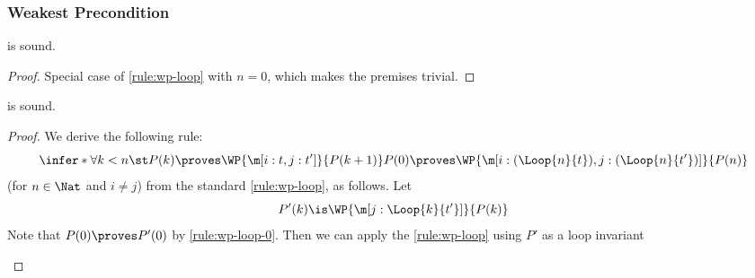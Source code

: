 \documentclass[acmsmall,nonacm,screen,appendix]{acmart}
\begin{document}
\subsubsection{Weakest Precondition}
\begin{lemma}
\label{proof:wp-loop-0}
   is sound.
\end{lemma}

\begin{proof}
  Special case of \ref{rule:wp-loop} with $n=0$,
  which makes the premises trivial.
\end{proof} \begin{lemma}
\label{proof:wp-loop-lockstep}
   is sound.
\end{lemma}

\begin{proof}
  We derive the following rule:
  \[
  \infer*{
    \forall k < n\st
      P(k) \proves \WP {\m[i: t, j: t']}{P(k+1)}
  }{
    P(0) \proves
    \WP {\m[i: (\Loop{n}{t}), j: (\Loop{n}{t'})]} {P(n)}
  }
  \]
  (for $n\in \Nat$ and $i \ne j$)
  from the standard \ref{rule:wp-loop},
  as follows.
  Let
  \[
    P'(k) \is
    \WP {\m[j: \Loop{k}{t'}]} {P(k)}
  \]
  Note that
  $P(0) \proves P'(0)$
  by \ref{rule:wp-loop-0}.
  Then we can apply the \ref{rule:wp-loop} using $P'$ as a loop invariant
  \begin{derivation}
\end{derivation}
\end{proof}
\end{document}
